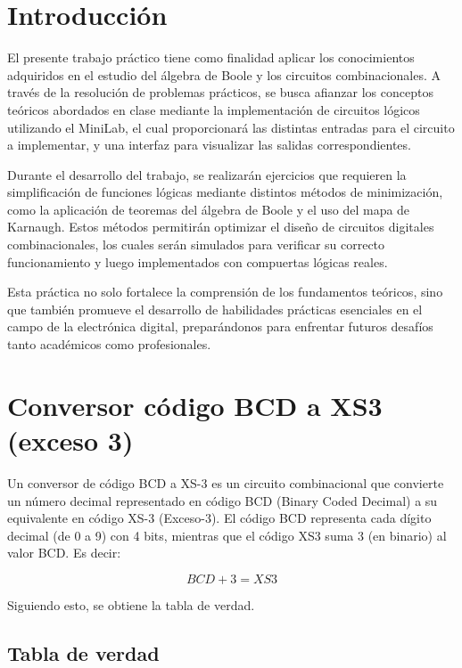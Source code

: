 \documentclass{informeutn}
\begin{document}
\maketitle
\tableofcontents

\chapter{Introducción}
El presente trabajo práctico tiene como finalidad aplicar los conocimientos adquiridos en el estudio del álgebra de Boole
y los circuitos combinacionales. A través de la resolución de problemas prácticos, se busca afianzar los conceptos teóricos abordados en
clase mediante la implementación de circuitos lógicos utilizando el MiniLab, el cual proporcionará las distintas entradas para el circuito a implementar,
y una interfaz para visualizar las salidas correspondientes.

Durante el desarrollo del trabajo, se realizarán ejercicios que requieren la simplificación de funciones lógicas mediante distintos métodos
de minimización, como la aplicación de teoremas del álgebra de Boole y el uso del mapa de Karnaugh. Estos métodos permitirán optimizar el
diseño de circuitos digitales combinacionales, los cuales serán simulados para verificar
su correcto funcionamiento y luego implementados con compuertas lógicas reales.

Esta práctica no solo fortalece la comprensión de los fundamentos teóricos, sino que también promueve el desarrollo de habilidades prácticas
esenciales en el campo de la electrónica digital, preparándonos para enfrentar futuros desafíos tanto académicos como profesionales.
    

\chapter{Conversor código BCD a XS3 (exceso 3)}
Un conversor de código BCD a XS-3 es un circuito combinacional que convierte un número decimal representado en código BCD
(Binary Coded Decimal) a su equivalente en código XS-3 (Exceso-3). El código BCD representa cada dígito decimal (de 0 a 9) con 4 bits,
mientras que el código XS3 suma 3 (en binario) al valor BCD. Es decir:

\begin{equation*}
    BCD + 3 = XS3
\end{equation*}

Siguiendo esto, se obtiene la tabla de verdad.

    \section{Tabla de verdad}
\end{document}
